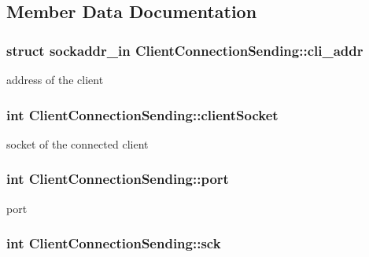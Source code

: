 \subsection{Member Data Documentation}
\hypertarget{class_client_connection_sending_aec17aabe2499433189a97fae837c1cdd}{
\subsubsection[{cli\-\_\-addr}]{\setlength{\rightskip}{0pt plus 5cm}struct sockaddr\-\_\-in Client\-Connection\-Sending\-::cli\-\_\-addr\hspace{0.3cm}{\ttfamily [private]}}}\label{class_client_connection_sending_aec17aabe2499433189a97fae837c1cdd}
address of the client \hypertarget{class_client_connection_sending_a9d593090ef980ec12a906f05c7049f8a}{
\subsubsection[{client\-Socket}]{\setlength{\rightskip}{0pt plus 5cm}int Client\-Connection\-Sending\-::client\-Socket\hspace{0.3cm}{\ttfamily [private]}}}\label{class_client_connection_sending_a9d593090ef980ec12a906f05c7049f8a}
socket of the connected client \hypertarget{class_client_connection_sending_a46f6eb02dfb831e080e1af31c8cb6e19}{
\subsubsection[{port}]{\setlength{\rightskip}{0pt plus 5cm}int Client\-Connection\-Sending\-::port\hspace{0.3cm}{\ttfamily [private]}}}\label{class_client_connection_sending_a46f6eb02dfb831e080e1af31c8cb6e19}
port \hypertarget{class_client_connection_sending_a94e310425cce20a9ca04e2fc8f9edc4e}{
\subsubsection[{sck}]{\setlength{\rightskip}{0pt plus 5cm}int Client\-Connection\-Sending\-::sck\hspace{0.3cm}{\ttfamily [private]}}}\label{class_client_connection_sending_a94e310425cce20a9ca04e2fc8f9edc4e}
